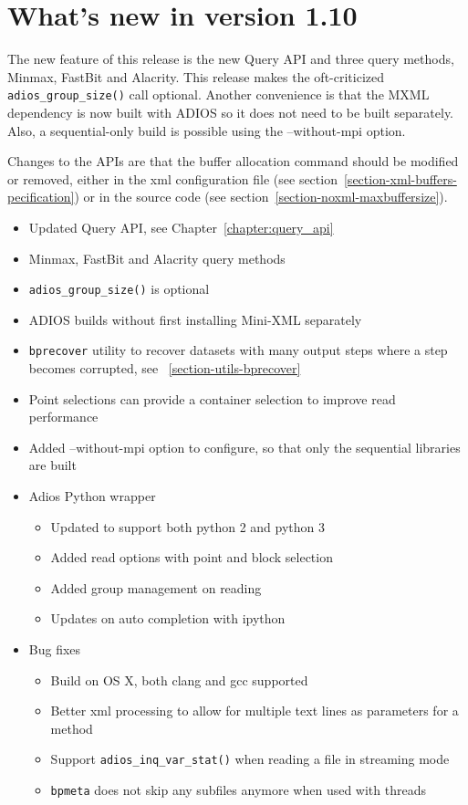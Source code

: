 \section {What's new in version 1.10}
The new feature of this release is the new Query API and three query methods, Minmax, FastBit and Alacrity. This release makes the oft-criticized \verb+adios_group_size()+ call optional. Another convenience is that the MXML dependency is now built with ADIOS so it does not need to be built separately. Also, a sequential-only build is possible using the --without-mpi option. 

Changes to the APIs are that the buffer allocation command should be modified or removed, either in the xml configuration file (see section~\ref{section-xml-buffers-pecification}) or in the source code (see section~\ref{section-noxml-maxbuffersize}).

\begin{itemize}
\item Updated Query API, see Chapter~\ref{chapter:query_api}
\item Minmax, FastBit and Alacrity query methods
\item \verb+adios_group_size()+ is optional
\item ADIOS builds without first installing Mini-XML separately
\item \verb+bprecover+ utility to recover datasets with many output steps where a step becomes corrupted, see ~\ref{section-utils-bprecover}
\item Point selections can provide a container selection to improve read performance
\item Added --without-mpi option to configure, so that only the sequential libraries are built
\item Adios Python wrapper
    \begin{itemize}
    \item Updated to support both python 2 and python 3
    \item Added read options with point and block selection
    \item Added group management on reading
    \item Updates on auto completion with ipython
    \end{itemize}

\item Bug fixes
    \begin{itemize}
    \item Build on OS X, both clang and gcc supported
    \item Better xml processing to allow for multiple text lines as parameters for a method
    \item Support \verb+adios_inq_var_stat()+ when reading a file in streaming mode
    \item \verb+bpmeta+ does not skip any subfiles anymore when used with threads
    \end{itemize}
\end{itemize}


